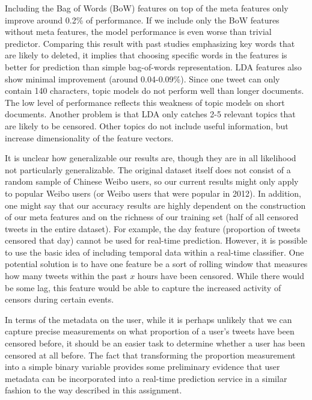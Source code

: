 \documentclass{sig-alternate-05-2015}
\begin{document}
Including the Bag of Words (BoW) features on top of the meta features only improve around 0.2\% of performance. If we include only the BoW features without meta features, the model performance is even worse than trivial predictor. Comparing this result with past studies emphasizing key words that are likely to deleted, it implies that choosing specific words in the features is better for prediction than simple bag-of-words representation. LDA features also show minimal improvement (around 0.04-0.09\%). Since one tweet can only contain 140 characters, topic models do not perform well than longer documents. The low level of performance reflects this weakness of topic models on short documents. Another problem is that LDA only catches 2-5 relevant topics that are likely to be censored. Other topics do not include useful information, but increase dimensionality of the feature vectors. 

It is unclear how generalizable our results are, though they are in all likelihood not particularly generalizable. The original dataset itself does not consist of a random sample of Chinese Weibo users, so our current results might only apply to popular Weibo users (or Weibo users that were popular in 2012). In addition, one might say that our accuracy results are highly dependent on the construction of our meta features and on the richness of our training set (half of all censored tweets in the entire dataset). For example, the day feature (proportion of tweets censored that day) cannot be used for real-time prediction. However, it is possible to use the basic idea of including temporal data within a real-time classifier. One potential solution is to have one feature be a sort of rolling window that measures how many tweets within the past $x$ hours have been censored. While there would be some lag, this feature would be able to capture the increased activity of censors during certain events.

In terms of the metadata on the user, while it is perhaps unlikely that we can capture precise measurements on what proportion of a user's tweets have been censored before, it should be an easier task to determine whether a user has been censored at all before. The fact that transforming the proportion measurement into a simple binary variable provides some preliminary evidence that user metadata can be incorporated into a real-time prediction service in a similar fashion to the way described in this assignment.
\end{document}
